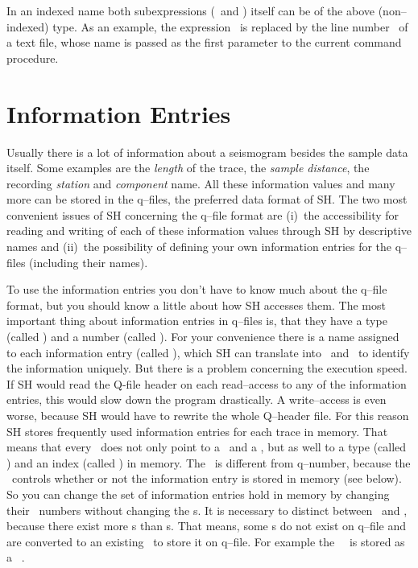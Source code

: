 In an indexed name both subexpressions (\ and
) itself can be of the above (non--indexed) type.  As
an example, the expression \ is replaced by the
line number \ of a text file, whose name is passed as the
first parameter to the current command procedure.



\section{Information Entries}
\label{sec:InfoEntries}

Usually there is a lot of information about a seismogram besides
the sample data itself.  Some examples are the {\em length} of
the trace, the {\em sample distance}, the recording {\em station}
and {\em component} name.  All these information values and many more
can be stored in the q--files, the preferred data format of SH.
The two most convenient issues of SH concerning the q--file format
are (i)~the accessibility for reading and writing of each of these
information values through SH by descriptive names and (ii)~the
possibility of defining your own information entries for the
q--files (including their names).

To use the information entries you don't have to know much about
the q--file format, but you should know a little about how SH
accesses them.  The most important thing about information
entries in q--files is, that they have a type (called )
and a number (called ).  For your convenience
there is a
name assigned to each information entry (called ), which
SH can translate into \ and \ to
identify the
information uniquely.  But there is a problem concerning the
execution speed.  If SH would read the Q-file header on each
read--access to any of the information entries, this would slow
down the program drastically.  A write--access is even worse, because
SH would have to rewrite the whole Q--header file.  For this reason
SH stores frequently used information entries for each trace in
memory.  That means that every \ does not only point to
a \ and a , but as well to a type
(called )
and an index (called ) in memory.  The
\
is different from q--number, because the \
controls whether
or not the information entry is stored in memory (see below).
So you can change the set of information entries hold in
memory by changing
their \shi{sh-index}\ numbers without changing the s.
It is necessary to distinct between \ and ,
because there exist more \shi{sh--type}s than s.
That means, some s do not exist on q--file and are
converted to an existing \shi{q--type}\ to store it on q--file.  For
example the \shi{sh--type}\ \sht{time}\ is stored as a \
.

